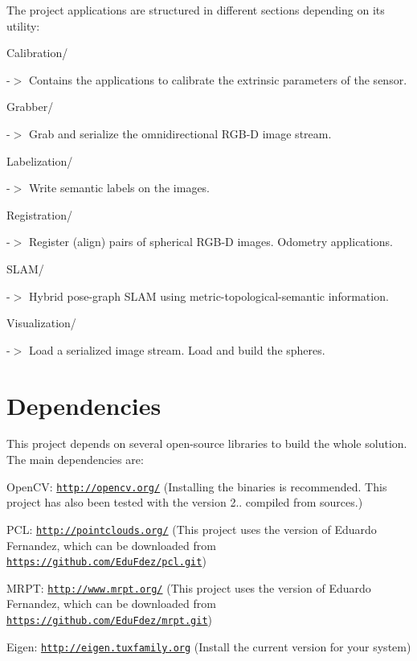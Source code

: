 The project applications are structured in different sections depending on its utility\-:
\begin{DoxyItemize}
\item Calibration/ \par
 -\/$>$ Contains the applications to calibrate the extrinsic parameters of the sensor.
\item Grabber/ \par
 -\/$>$ Grab and serialize the omnidirectional R\-G\-B-\/\-D image stream.
\item Labelization/ \par
 -\/$>$ Write semantic labels on the images.
\item Registration/ \par
 -\/$>$ Register (align) pairs of spherical R\-G\-B-\/\-D images. Odometry applications.
\item S\-L\-A\-M/ \par
 -\/$>$ Hybrid pose-\/graph S\-L\-A\-M using metric-\/topological-\/semantic information.
\item Visualization/ \par
 -\/$>$ Load a serialized image stream. Load and build the spheres.
\end{DoxyItemize}\hypertarget{index_dependencies_sec}{}\section{Dependencies}\label{index_dependencies_sec}
This project depends on several open-\/source libraries to build the whole solution. The main dependencies are\-:
\begin{DoxyItemize}
\item Open\-C\-V\-: \href{http://opencv.org/}{\tt http\-://opencv.\-org/} (Installing the binaries is recommended. This project has also been tested with the version 2.. compiled from sources.)
\item P\-C\-L\-: \href{http://pointclouds.org/}{\tt http\-://pointclouds.\-org/} (This project uses the version of Eduardo Fernandez, which can be downloaded from \href{https://github.com/EduFdez/pcl.git}{\tt https\-://github.\-com/\-Edu\-Fdez/pcl.\-git})
\item M\-R\-P\-T\-: \href{http://www.mrpt.org/}{\tt http\-://www.\-mrpt.\-org/} (This project uses the version of Eduardo Fernandez, which can be downloaded from \href{https://github.com/EduFdez/mrpt.git}{\tt https\-://github.\-com/\-Edu\-Fdez/mrpt.\-git})
\item Eigen\-: \href{http://eigen.tuxfamily.org}{\tt http\-://eigen.\-tuxfamily.\-org} (Install the current version for your system)
\end{DoxyItemize}

